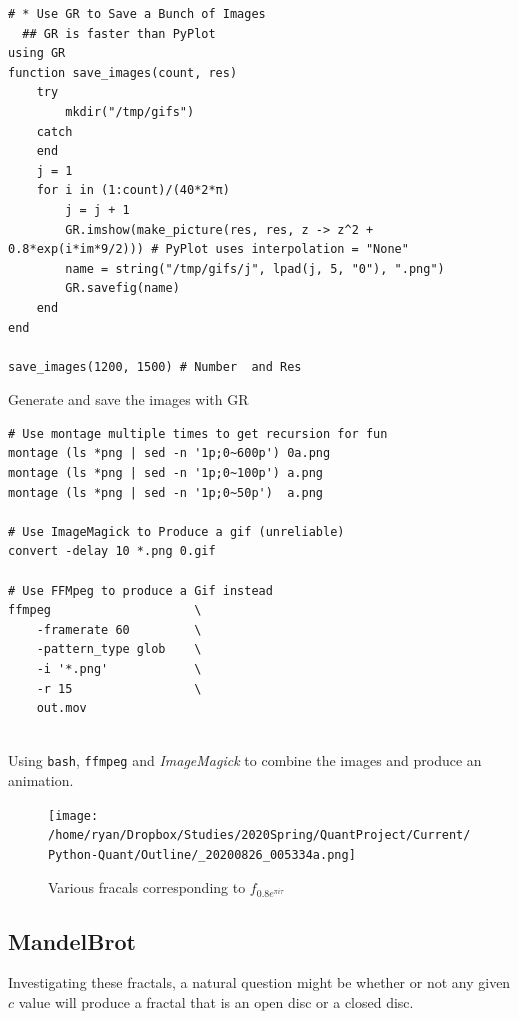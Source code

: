 \documentclass[11pt]{article}
\begin{document}
\begin{listing}[htbp]
\begin{verbatim}
# * Use GR to Save a Bunch of Images
  ## GR is faster than PyPlot
using GR
function save_images(count, res)
    try
        mkdir("/tmp/gifs")
    catch
    end
    j = 1
    for i in (1:count)/(40*2*π)
        j = j + 1
        GR.imshow(make_picture(res, res, z -> z^2 + 0.8*exp(i*im*9/2))) # PyPlot uses interpolation = "None"
        name = string("/tmp/gifs/j", lpad(j, 5, "0"), ".png")
        GR.savefig(name)
    end
end

save_images(1200, 1500) # Number  and Res
\end{verbatim}
\caption{\label{GR-save}Generate and save the images with GR}
\end{listing}

\begin{listing}[htbp]
\begin{verbatim}
# Use montage multiple times to get recursion for fun
montage (ls *png | sed -n '1p;0~600p') 0a.png
montage (ls *png | sed -n '1p;0~100p') a.png
montage (ls *png | sed -n '1p;0~50p')  a.png

# Use ImageMagick to Produce a gif (unreliable)
convert -delay 10 *.png 0.gif

# Use FFMpeg to produce a Gif instead
ffmpeg                    \
    -framerate 60         \
    -pattern_type glob    \
    -i '*.png'            \
    -r 15                 \
    out.mov


\end{verbatim}
\caption{\label{bash-frac-join}Using \texttt{bash}, \texttt{ffmpeg} and \emph{ImageMagick} to combine the images and produce an animation.}
\end{listing}

\begin{figure}[htbp]
\centering
\texttt{[image: /home/ryan/Dropbox/Studies/2020Spring/QuantProject/Current/Python-Quant/Outline/\_20200826\_005334a.png]}
\caption{\label{montage-frac}Various fracals corresponding to \(f_{0.8 e^{\pi i \tau}}\)}
\end{figure}

\subsection{MandelBrot}
\label{sec:org8e42e30}
Investigating these fractals, a natural question might be whether or not any
given \(c\) value will produce a fractal that is an open disc or a closed disc.
\end{document}
